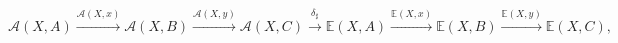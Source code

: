 \documentclass[preview]{standalone}
\begin{document}
\begin{center}
$$\mathscr{A}(X,A) \xrightarrow{\mathscr{A}(X,x)} \mathscr{A}(X,B) \xrightarrow{\mathscr{A}(X,y)} \mathscr{A}(X,C) \xrightarrow{\delta_\sharp} \mathbb{E}(X,A) \xrightarrow{\mathbb{E}(X,x)} \mathbb{E}(X,B) \xrightarrow{\mathbb{E}(X,y)} \mathbb{E}(X,C),$$
\end{center}
\end{document}
